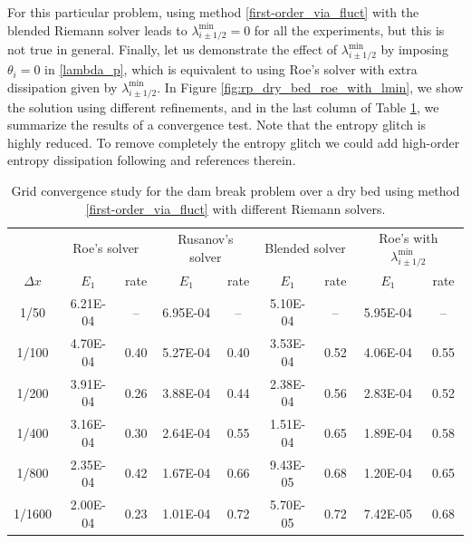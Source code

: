 \documentclass[preprint, 11pt]{article}
\begin{document}
For this particular problem, using method \eqref{first-order_via_fluct} with the blended Riemann solver
leads to $\lambda_{i\pm 1/2}^{\min}=0$ for all the experiments, but this is not true in general.
Finally, let us demonstrate the effect of $\lambda_{i\pm 1/2}^{\min}$ by imposing $\theta_{i}=0$ in \eqref{lambda_p},
which is equivalent to using Roe's solver with extra dissipation given by $\lambda_{i\pm 1/2}^{\min}$.
In Figure \ref{fig:rp_dry_bed_roe_with_lmin}, we show the solution using different refinements,
and in the last column of Table \ref{table:rp_dry_bed}, we summarize the results of a convergence test.
Note that the entropy glitch is highly reduced.
To remove completely the entropy glitch we could add high-order entropy dissipation following \cite{tadmor2003entropy}
and references therein.

\begin{table}[!ht]\scriptsize
  \begin{center}
    \begin{tabular}{||c||c|c||c|c||c|c||c|c||} \hline
      & \multicolumn{2}{c||}{Roe's solver}
      &\multicolumn{2}{c||}{Rusanov's solver}
      &\multicolumn{2}{c||}{Blended solver}
      &\multicolumn{2}{c||}{Roe's with $\lambda_{i\pm 1/2}^{\min}$} \\ \cline{2-9}
      $\Delta x$ & $E_1$ & rate & $E_1$ & rate & $E_1$ & rate & $E_1$ & rate \\ \hline
      1/50   & 6.21E-04 &  --  & 6.95E-04 &   -- & 5.10E-04 &  --  & 5.95E-04 & --   \\
      1/100  & 4.70E-04 & 0.40 & 5.27E-04 & 0.40 & 3.53E-04 & 0.52 & 4.06E-04 & 0.55 \\
      1/200  & 3.91E-04 & 0.26 & 3.88E-04 & 0.44 & 2.38E-04 & 0.56 & 2.83E-04 & 0.52 \\
      1/400  & 3.16E-04 & 0.30 & 2.64E-04 & 0.55 & 1.51E-04 & 0.65 & 1.89E-04 & 0.58 \\
      1/800  & 2.35E-04 & 0.42 & 1.67E-04 & 0.66 & 9.43E-05 & 0.68 & 1.20E-04 & 0.65 \\
      1/1600 & 2.00E-04 & 0.23 & 1.01E-04 & 0.72 & 5.70E-05 & 0.72 & 7.42E-05 & 0.68 \\ \hline
    \end{tabular}
    \caption{Grid convergence study for the dam break problem over a dry bed
      using method \eqref{first-order_via_fluct} with different Riemann solvers.\label{table:rp_dry_bed}}
  \end{center}
\end{table}
\end{document}
